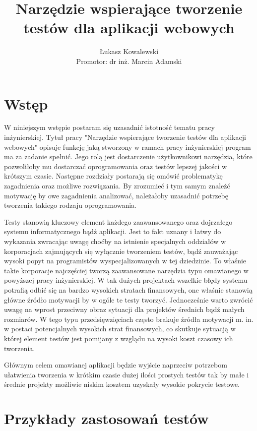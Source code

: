 \documentclass[12pt]{report}
\title{Narzędzie wspierające tworzenie testów dla aplikacji webowych}
\author{
    Łukasz Kowalewski \\ %
    \vspace{0.5cm} %
    Promotor: dr inż. Marcin Adamski %
}
\date{}
\begin{document}
\maketitle

\tableofcontents
\newpage

\chapter{Wstęp}

W niniejszym wstępie postaram się uzasadnić istotność tematu pracy inżynierskiej. Tytuł pracy "Narzędzie wspierające tworzenie testów dla aplikacji webowych" opisuje funkcję jaką stworzony w ramach pracy inżynierskiej program ma za zadanie spełnić. Jego rolą jest dostarczenie użytkownikowi narzędzia, które pozwoliłoby mu dostarczać oprogramowania oraz testów lepszej jakości w krótszym czasie. Następne rozdziały postarają się omówić problematykę zagadnienia oraz możliwe rozwiązania. By zrozumieć i tym samym znaleźć motywację by owe zagadnienia analizować, należałoby uzasadnić potrzebę tworzenia takiego rodzaju oprogramowania.

Testy stanowią kluczowy element każdego zaawansowanego oraz dojrzałego systemu informatycznego bądź aplikacji. Jest to fakt uznany i łatwy do wykazania zwracając uwagę choćby na istnienie specjalnych oddziałów w korporacjach zajmujących się wyłącznie tworzeniem testów, bądź zauważając wysoki popyt na programistów wyspecjalizowanych w tej dziedzinie. To właśnie takie korporacje najczęściej tworzą zaawansowane narzędzia typu omawianego w powyższej pracy inżynierskiej. W tak dużych projektach wszelkie błędy systemu potrafią odbić się na bardzo wysokich stratach finansowych, one właśnie stanowią główne źródło motywacji by w ogóle te testy tworzyć. Jednocześnie warto zwrócić uwagę na wprost przeciwny obraz sytuacji dla projektów średnich bądź małych rozmiarów. W tego typu przedsięwzięciach często brakuje źródła motywacji m. in. w postaci potencjalnych wysokich strat finansowych, co skutkuje sytuacją w której element testów jest pomijany z wzglądu na wysoki koszt czasowy ich tworzenia.

Głównym celem omawianej aplikacji będzie wyjście naprzeciw potrzebom ułatwienia tworzenia w krótkim czasie dużej ilości prostych testów tak by małe i średnie projekty możliwie niskim kosztem uzyskały wysokie pokrycie testowe.

\chapter{Przykłady zastosowań testów}
\end{document}
